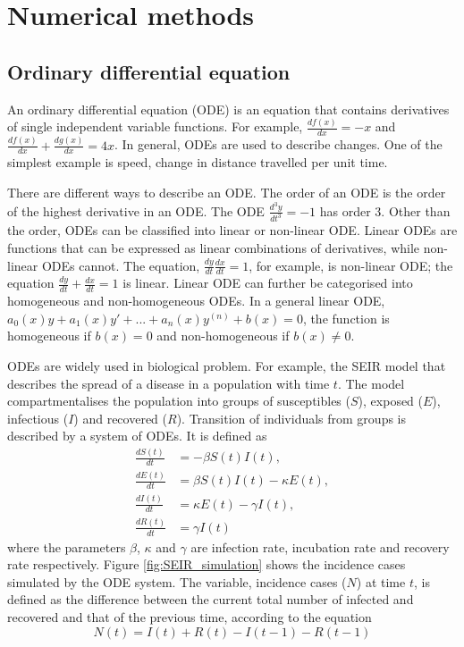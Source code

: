 \chapter{Numerical methods}
\label{chap:numerical-methods}
\section{Ordinary differential equation}
An ordinary differential equation (ODE) is an equation that contains derivatives of single independent variable functions. For example, $\frac{df(x)}{dx}=-x$ and $\frac{df(x)}{dx} + \frac{dg(x)}{dx} = 4x$. In general, ODEs are used to describe changes. One of the simplest example is speed, change in distance travelled per unit time. 

There are different ways to describe an ODE. The order of an ODE is the order of the highest derivative in an ODE. The ODE $\frac{d^3y}{dt^3} = -1$ has order 3. Other than the order, ODEs can be classified into linear or non-linear ODE. Linear ODEs are functions that can be expressed as linear combinations of derivatives, while non-linear ODEs cannot. The equation, $\frac{dy}{dt} \frac{dx}{dt} = 1$, for example, is non-linear ODE; the equation $\frac{dy}{dt} + \frac{dx}{dt} = 1$ is linear.
Linear ODE can further be categorised into homogeneous and non-homogeneous ODEs. In a general linear ODE, $a_0(x)y+a_1(x)y'+...+a_n(x)y^{(n)}+b(x) = 0$, the function is homogeneous if $b(x) = 0$ and non-homogeneous if $b(x) \neq 0$.

ODEs are widely used in biological problem. For example, the SEIR model that describes the spread of a disease in a population with time $t$. The model compartmentalises the population into groups of susceptibles ($S$), exposed ($E$), infectious ($I$) and recovered ($R$). Transition of individuals from groups is described by a system of ODEs. It is defined as 
\begin{align}
\label{eqn:SEIR-model}
    \frac{dS(t)}{dt} &= -\beta S(t)I(t),  \\ 
    \frac{dE(t)}{dt} &= \beta S(t)I(t) - \kappa E(t), \\
    \frac{dI(t)}{dt} &= \kappa E(t) - \gamma I(t), \\
    \frac{dR(t)}{dt} &= \gamma I(t) \label{eqn:SEIR-end}
\end{align}
where the parameters $\beta$, $\kappa$ and $\gamma$ are infection rate, incubation rate and recovery rate respectively. Figure \ref{fig:SEIR_simulation} shows the incidence cases simulated by the ODE system. The variable, incidence cases ($N$) at time $t$, is defined as the difference between the current total number of infected and recovered and that of the previous time, according to the equation
\begin{equation}
    N(t) = I(t) + R(t) - I(t-1) - R(t-1)
\end{equation}

